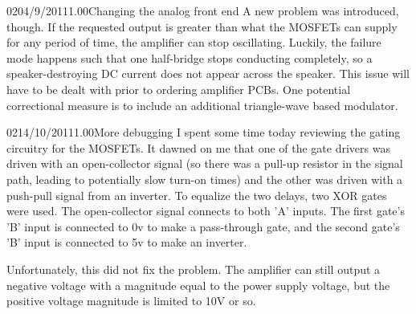 \documentclass[12pt,letterpaper,onecolumn]{article}
\begin{document}
\begin{nbentry}{020}{4/9/2011}{1.00}{Changing the analog front end}
A new problem was introduced, though.  If the requested output is greater than what the MOSFETs can supply for any period of time, the amplifier can stop oscillating.  Luckily, the failure mode happens such that one half-bridge stops conducting completely, so a speaker-destroying DC current does not appear across the speaker.  This issue will have to be dealt with prior to ordering amplifier PCBs.  One potential correctional measure is to include an additional triangle-wave based modulator.
\end{nbentry}

\begin{nbentry}{021}{4/10/2011}{1.00}{More debugging}
I spent some time today reviewing the gating circuitry for the MOSFETs.  It dawned on me that one of the gate drivers was driven with an open-collector signal (so there was a pull-up resistor in the signal path, leading to potentially slow turn-on times) and the other was driven with a push-pull signal from an inverter.  To equalize the two delays, two XOR gates were used.  The open-collector signal connects to both 'A' inputs.  The first gate's 'B' input is connected to 0v to make a pass-through gate, and the second gate's 'B' input is connected to 5v to make an inverter.

Unfortunately, this did not fix the problem.  The amplifier can still output a negative voltage with a magnitude equal to the power supply voltage, but the positive voltage magnitude is limited to 10V or so.
\end{nbentry}
\end{document}
